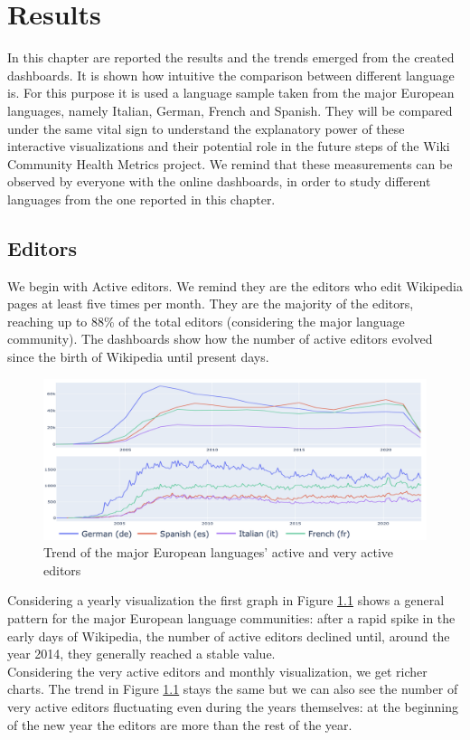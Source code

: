 \chapter{Results}
\label{cha:results}

In this chapter are reported the results and the trends emerged from the created dashboards. It is shown how intuitive the comparison between different language is. For this purpose it is used a language sample taken from the major European languages, namely Italian, German, French and Spanish. They will be compared under the same vital sign to understand the explanatory power of these interactive visualizations and their potential role in the future steps of the Wiki Community Health Metrics project.
We remind that these measurements can be observed by everyone with the online dashboards\cite{vitalsign}, in order to study different languages from the one reported in this chapter. 

\section{Editors}
\label{sec:editors_conclusion}

We begin with Active editors. We remind they are the editors who edit Wikipedia pages at least five times per month. They are the majority of the editors, reaching up to 88\% of the total editors (considering the major language community). The dashboards show how the number of active editors evolved since the birth of Wikipedia until present days.

\begin{figure}[h]
    \centering
    \includegraphics[width=470px]{img/editors_trend.png}
    \caption{Trend of the major European languages' active and very active editors}
    \label{fig:editors_trend}
\end{figure}

Considering a yearly visualization the first graph in Figure  \ref{fig:editors_trend} shows a general pattern for the major European language communities: after a rapid spike in the early days of Wikipedia, the number of active editors declined until, around the year 2014, they generally reached a stable value.\\
Considering the very active editors and monthly visualization, we get richer charts. The trend in Figure \ref{fig:editors_trend} stays the same but we can also see the number of very active editors fluctuating even during the years themselves: at the beginning of the new year the editors are more than the rest of the year.

